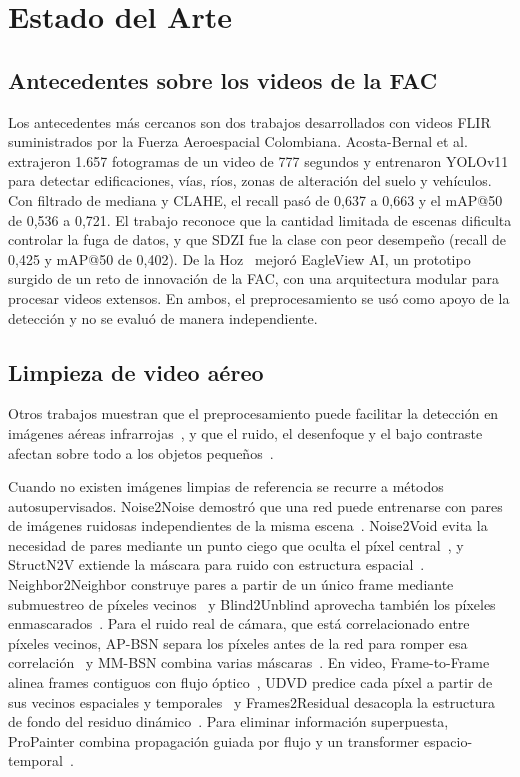 \section{Estado del Arte}
\label{sec:estado_arte}

\subsection{Antecedentes sobre los videos de la FAC}
Los antecedentes más cercanos son dos trabajos desarrollados con videos FLIR suministrados por la Fuerza Aeroespacial Colombiana. Acosta-Bernal et al.~\cite{acosta2025eyes} extrajeron 1.657 fotogramas de un video de 777 segundos y entrenaron YOLOv11 para detectar edificaciones, vías, ríos, zonas de alteración del suelo y vehículos. Con filtrado de mediana y CLAHE, el recall pasó de 0,637 a 0,663 y el mAP@50 de 0,536 a 0,721. El trabajo reconoce que la cantidad limitada de escenas dificulta controlar la fuga de datos, y que SDZI fue la clase con peor desempeño (recall de 0,425 y mAP@50 de 0,402). De la Hoz~\cite{delahoz2025enhancing} mejoró EagleView AI, un prototipo surgido de un reto de innovación de la FAC, con una arquitectura modular para procesar videos extensos. En ambos, el preprocesamiento se usó como apoyo de la detección y no se evaluó de manera independiente.

\subsection{Limpieza de video aéreo}
Otros trabajos muestran que el preprocesamiento puede facilitar la detección en imágenes aéreas infrarrojas~\cite{jiang2023infrared,ozyurt2024contrast}, y que el ruido, el desenfoque y el bajo contraste afectan sobre todo a los objetos pequeños~\cite{hovhannisyan2025thermal,luo2025yolosmug,wang2026sgwdetr}.

Cuando no existen imágenes limpias de referencia se recurre a métodos autosupervisados. Noise2Noise demostró que una red puede entrenarse con pares de imágenes ruidosas independientes de la misma escena~\cite{lehtinen2018noise2noise}. Noise2Void evita la necesidad de pares mediante un punto ciego que oculta el píxel central~\cite{krull2019noise2void}, y StructN2V extiende la máscara para ruido con estructura espacial~\cite{broaddus2020structn2v}. Neighbor2Neighbor construye pares a partir de un único frame mediante submuestreo de píxeles vecinos~\cite{huang2021neighbor2neighbor} y Blind2Unblind aprovecha también los píxeles enmascarados~\cite{wang2022blind2unblind}. Para el ruido real de cámara, que está correlacionado entre píxeles vecinos, AP-BSN separa los píxeles antes de la red para romper esa correlación~\cite{lee2022apbsn} y MM-BSN combina varias máscaras~\cite{zhang2023mmbsn}. En video, Frame-to-Frame alinea frames contiguos con flujo óptico~\cite{ehret2019modelblind}, UDVD predice cada píxel a partir de sus vecinos espaciales y temporales~\cite{sheth2021udvd} y Frames2Residual desacopla la estructura de fondo del residuo dinámico~\cite{ji2026frames2residual}. Para eliminar información superpuesta, ProPainter combina propagación guiada por flujo y un transformer espacio-temporal~\cite{zhou2023propainter}.

